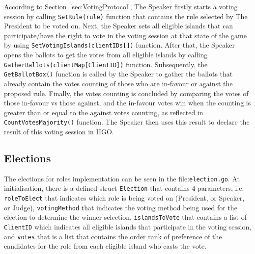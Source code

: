 According to Section~\ref{sec:VotingProtocol}, The Speaker firstly starts a voting session by calling \texttt{SetRule(rule)} function that contains the rule selected by The President to be voted on. Next, the Speaker sets all eligible islands that can participate/have the right to vote in the voting session at that state of the game by using \texttt{SetVotingIslands(clientIDs[])} function. After that, the Speaker opens the ballots to get the votes from all eligible islands by calling \texttt{GatherBallots(clientMap[ClientID])} function. Subsequently, the \texttt{GetBallotBox()} function is called by the Speaker to gather the ballots that already contain the votes counting of those who are in-favour or against the proposed rule. Finally, the votes counting is concluded by comparing the votes of those in-favour vs those against, and the in-favour votes win when the counting is greater than or equal to the against votes counting, as reflected in \texttt{CountVotesMajority()} function. The Speaker then uses this result to declare the result of this voting session in IIGO.

\subsection{Elections}
\label{subsec:Elections}
The elections for roles implementation can be seen in the file:\texttt{election.go}. At initialisation, there is a defined struct \texttt{Election} that contains 4 parameters, i.e. \texttt{roleToElect} that indicates which role is being voted on (President, or Speaker, or Judge), \texttt{votingMethod} that indicates the voting method being used for the election to determine the winner selection, \texttt{islandsToVote} that contains a list of \texttt{ClientID} which indicates all eligible islands that participate in the voting session, and \texttt{votes} that is a list that contains the order rank of preference of the candidates for the role from each eligible island who casts the vote.

